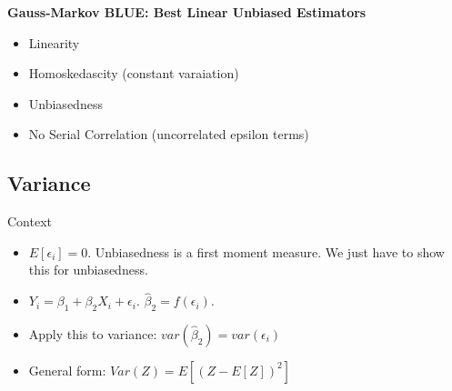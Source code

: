 \documentclass[10pt, oneside]{article}
\begin{document}
\textbf{Gauss-Markov BLUE: Best Linear Unbiased Estimators}
\begin{itemize}
    \item Linearity
    \item Homoskedascity (constant varaiation)
    \item Unbiasedness
    \item No Serial Correlation (uncorrelated epsilon terms)
\end{itemize}
\subsection{Variance}
Context
\begin{itemize}
    \item $E[\epsilon_i] =0$. Unbiasedness is a first moment measure. We just have to show this for unbiasedness.
    \item $Y_i = \beta_1 + \beta_2 X_i +\epsilon_i$. $\hat \beta_2 =f(\epsilon_i)$.
    \item Apply this to variance: $var(\hat \beta_2) = var(\epsilon_i)$
    \item General form: $Var(Z)=E[(Z-E[Z])^2]$
\end{itemize}
\end{document}
